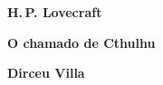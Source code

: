 \textbf{H.\,P. Lovecraft} \lipsum[1] 

\textbf{O chamado de Cthulhu} \lipsum[1] 
 
\textbf{Dirceu Villa} \lipsum[1] 


